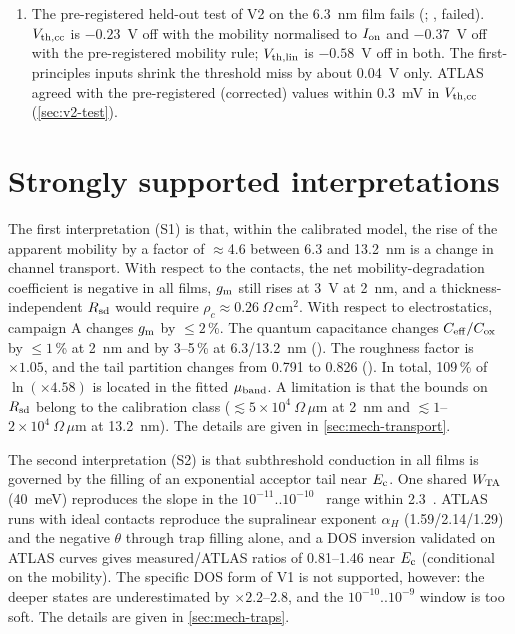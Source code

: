 \begin{enumerate}
  \item The pre-registered held-out test of V2 on the 6.3~nm film fails (; \evOOS, failed). $V_{\mathrm{th,cc}}$ is $-0.23$~V off with the mobility normalised to $I_{\mathrm{on}}$ and $-0.37$~V off with the pre-registered mobility rule; $V_{\mathrm{th,lin}}$ is $-0.58$~V off in both. The first-principles inputs shrink the threshold miss by about 0.04~V only. ATLAS agreed with the pre-registered (corrected) values within 0.3~mV in $V_{\mathrm{th,cc}}$ (\cref{sec:v2-test}).
\end{enumerate}

\section{Strongly supported interpretations}\label{sec:concl-supported}

The first interpretation (S1) is that, within the calibrated model, the rise of the apparent mobility by a factor of $\approx$4.6 between 6.3 and 13.2~nm is a change in channel transport. With respect to the contacts, the net mobility-degradation coefficient is negative in all films, $g_{\mathrm{m}}$ still rises at 3~V at 2~nm, and a thickness-independent $R_{\mathrm{sd}}$ would require $\rho_c\approx0.26~\Omega\,\mathrm{cm}^2$. With respect to electrostatics, campaign A changes $g_{\mathrm{m}}$ by $\le2$\,\%. The quantum capacitance changes $C_{\mathrm{eff}}/C_{\mathrm{ox}}$ by $\le1$\,\% at 2~nm and by 3--5\,\% at 6.3/13.2~nm (\evSURR). The roughness factor is $\times1.05$, and the tail partition changes from 0.791 to 0.826 (\evSURR). In total, 109\,\% of $\ln(\times4.58)$ is located in the fitted $\mu_{\mathrm{band}}$. A limitation is that the bounds on $R_{\mathrm{sd}}$ belong to the calibration class ($\lesssim5\times10^4~\Omega\,\mu$m at 2~nm and $\lesssim1$--$2\times10^4~\Omega\,\mu$m at 13.2~nm). The details are given in \cref{sec:mech-transport}.

The second interpretation (S2) is that subthreshold conduction in all films is governed by the filling of an exponential acceptor tail near $E_{\mathrm{c}}$. One shared $W_{\mathrm{TA}}$ (40~meV) reproduces the slope in the $10^{-11}$..$10^{-10}$~\Aum{} range within 2.3~\mVdec. ATLAS runs with ideal contacts reproduce the supralinear exponent $\alpha_H$ (1.59/2.14/1.29) and the negative $\theta$ through trap filling alone, and a DOS inversion validated on ATLAS curves gives measured/ATLAS ratios of 0.81--1.46 near $E_{\mathrm{c}}$ (conditional on the mobility). The specific DOS form of V1 is not supported, however: the deeper states are underestimated by $\times2.2$--2.8, and the $10^{-10}$..$10^{-9}$ window is too soft. The details are given in \cref{sec:mech-traps}.

